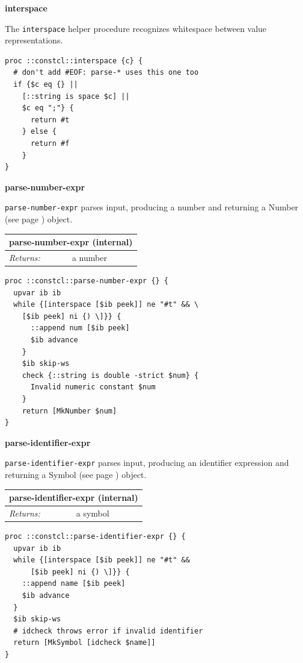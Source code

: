 \documentclass[twoside,9pt]{report}
\begin{document}
\textbf{interspace}


The \texttt{interspace} helper procedure recognizes whitespace between value representations.

\noindent\makebox[\linewidth]{\rule{\linewidth}{0.4pt}}
\begin{lstlisting}
proc ::constcl::interspace {c} {
  # don't add #EOF: parse-* uses this one too
  if {$c eq {} ||
    [::string is space $c] ||
    $c eq ";"} {
      return #t
    } else {
      return #f
    }
}
\end{lstlisting}
\noindent\makebox[\linewidth]{\rule{\linewidth}{0.4pt}}

\textbf{parse-number-expr}


\texttt{parse-number-expr} parses input, producing a number and returning a Number (see page \pageref{numbers}) object.

\begin{tabular}{ |l l| }
\hline
\multicolumn{2}{|l|}{parse-number-expr (internal)} \\
\hline
\textit{Returns:} & a number \\
\hline
\end{tabular}

\noindent\makebox[\linewidth]{\rule{\linewidth}{0.4pt}}
\begin{lstlisting}
proc ::constcl::parse-number-expr {} {
  upvar ib ib
  while {[interspace [$ib peek]] ne "#t" && \
    [$ib peek] ni {) \]}} {
      ::append num [$ib peek]
      $ib advance
    }
    $ib skip-ws
    check {::string is double -strict $num} {
      Invalid numeric constant $num
    }
    return [MkNumber $num]
}
\end{lstlisting}
\noindent\makebox[\linewidth]{\rule{\linewidth}{0.4pt}}

\textbf{parse-identifier-expr}


\texttt{parse-identifier-expr} parses input, producing an identifier expression and returning a Symbol (see page \pageref{symbols}) object.

\begin{tabular}{ |l l| }
\hline
\multicolumn{2}{|l|}{parse-identifier-expr (internal)} \\
\hline
\textit{Returns:} & a symbol \\
\hline
\end{tabular}

\noindent\makebox[\linewidth]{\rule{\linewidth}{0.4pt}}
\begin{lstlisting}
proc ::constcl::parse-identifier-expr {} {
  upvar ib ib
  while {[interspace [$ib peek]] ne "#t" &&
      [$ib peek] ni {) \]}} {
    ::append name [$ib peek]
    $ib advance
  }
  $ib skip-ws
  # idcheck throws error if invalid identifier
  return [MkSymbol [idcheck $name]]
}
\end{lstlisting}
\noindent\makebox[\linewidth]{\rule{\linewidth}{0.4pt}}
\end{document}
